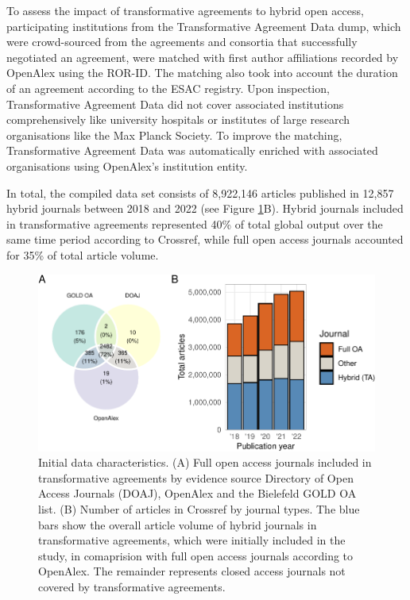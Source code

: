 \documentclass[a4paper,man,floatsintext,longtable,noextraspace,12pt]{apa6}
\begin{document}
To assess the impact of transformative agreements to hybrid open access,
participating institutions from the Transformative Agreement Data dump,
which were crowd-sourced from the agreements and consortia that
successfully negotiated an agreement, were matched with first author
affiliations recorded by OpenAlex using the ROR-ID. The matching also
took into account the duration of an agreement according to the ESAC
registry. Upon inspection, Transformative Agreement Data did not cover
associated institutions comprehensively like university hospitals or
institutes of large research organisations like the Max Planck Society.
To improve the matching, Transformative Agreement Data was automatically
enriched with associated organisations using OpenAlex's institution
entity.

In total, the compiled data set consists of 8,922,146 articles published
in 12,857 hybrid journals between 2018 and 2022 (see Figure
\ref{fig:method_fig}B). Hybrid journals included in transformative
agreements represented 40\% of total global output over the same time
period according to Crossref, while full open access journals accounted
for 35\% of total article volume.

\begin{figure}[ht!]

{\centering \includegraphics[width=0.99\linewidth,]{fig/method_fig-1} 

}

\caption{Initial data characteristics. (A) Full open access journals included in transformative agreements by evidence source Directory of Open Access Journals (DOAJ), OpenAlex and the Bielefeld GOLD OA list. (B) Number of articles in Crossref by journal types. The blue bars show the overall article volume of hybrid journals in transformative agreements, which were initially included in the study, in comaprision with full open access journals according to OpenAlex. The remainder represents closed access journals not covered by transformative agreements.}\label{fig:method_fig}
\end{figure}
\end{document}
